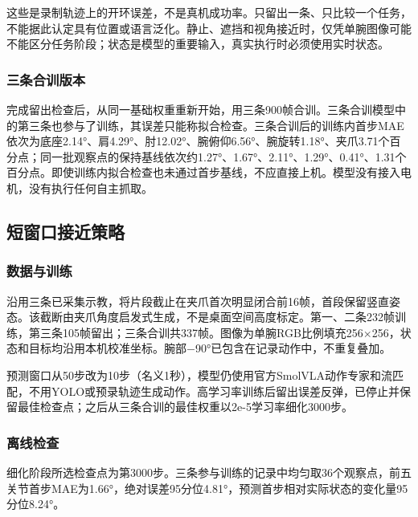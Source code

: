 这些是录制轨迹上的开环误差，不是真机成功率。只留出一条、只比较一个任务，不能据此认定具有位置或语言泛化。静止、遮挡和视角接近时，仅凭单腕图像可能不能区分任务阶段；状态是模型的重要输入，真实执行时必须使用实时状态。

\subsubsection{三条合训版本}\label{s07-detail-8}

完成留出检查后，从同一基础权重重新开始，用三条900帧合训。三条合训模型中的第三条也参与了训练，其误差只能称拟合检查。三条合训后的训练内首步MAE依次为底座2.14°、肩4.29°、肘12.02°、腕俯仰6.56°、腕旋转1.18°、夹爪3.71个百分点；同一批观察点的保持基线依次约1.27°、1.67°、2.11°、1.29°、0.41°、1.31个百分点。即使训练内拟合检查也未通过首步基线，不应直接上机。模型没有接入电机，没有执行任何自主抓取。



\subsection{短窗口接近策略}\label{s07-detail-9}

\subsubsection{数据与训练}\label{s07-detail-10}

沿用三条已采集示教，将片段截止在夹爪首次明显闭合前16帧，首段保留竖直姿态。该截断由夹爪角度启发式生成，不是桌面空间高度标定。第一、二条232帧训练，第三条105帧留出；三条合训共337帧。图像为单腕RGB比例填充256\(\times\)256，状态和目标均沿用本机校准坐标。腕部−90°已包含在记录动作中，不重复叠加。

预测窗口从50步改为10步（名义1秒），模型仍使用官方SmolVLA动作专家和流匹配，不用YOLO或预录轨迹生成动作。高学习率训练后留出误差反弹，已停止并保留最佳检查点；之后从三条合训的最佳权重以2e-5学习率细化3000步。


\subsubsection{离线检查}\label{s07-detail-11}

细化阶段所选检查点为第3000步。三条参与训练的记录中均匀取36个观察点，前五关节首步MAE为1.66°，绝对误差95分位4.81°，预测首步相对实际状态的变化量95分位8.24°。

